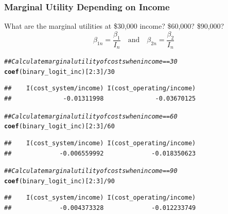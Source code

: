 \documentclass{beamer}\usepackage[]{graphicx}\usepackage[]{xcolor}
\makeatletter
\newcommand{\hlnum}[1]{\textcolor[rgb]{0.686,0.059,0.569}{#1}}%
\newcommand{\hlcom}[1]{\textcolor[rgb]{0.678,0.584,0.686}{\textit{#1}}}%
\newcommand{\hlopt}[1]{\textcolor[rgb]{0,0,0}{#1}}%
\newcommand{\hlstd}[1]{\textcolor[rgb]{0.345,0.345,0.345}{#1}}%
\newcommand{\hlkwd}[1]{\textcolor[rgb]{0.737,0.353,0.396}{\textbf{#1}}}%
\newenvironment{kframe}{%
 \def\at@end@of@kframe{}%
 \ifinner\ifhmode%
  \def\at@end@of@kframe{\end{minipage}}%
  \begin{minipage}{\columnwidth}%
 \fi\fi%
 \def\FrameCommand##1{\hskip\@totalleftmargin \hskip-\fboxsep
 \colorbox{shadecolor}{##1}\hskip-\fboxsep
     \hskip-\linewidth \hskip-\@totalleftmargin \hskip\columnwidth}%
 \MakeFramed {\advance\hsize-\width
   \@totalleftmargin\z@ \linewidth\hsize
   \@setminipage}}%
 {\par\unskip\endMakeFramed%
 \at@end@of@kframe}
\newenvironment{knitrout}{}{} %
\makeatother
\begin{document}
\begin{frame}[fragile]\frametitle{Marginal Utility Depending on Income}
    What are the marginal utilities at \$30,000 income? \$60,000? \$90,000?
    $$\beta_{1n} = \frac{\beta_1}{I_n} \quad \text{and} \quad \beta_{2n} = \frac{\beta_2}{I_n}$$
\begin{knitrout}\footnotesize
{}\color{fgcolor}\begin{kframe}
\begin{alltt}
\hlcom{## Calculate marginal utility of costs when income == 30}
\hlkwd{coef}\hlstd{(binary_logit_inc)[}\hlnum{2}\hlopt{:}\hlnum{3}\hlstd{]} \hlopt{/} \hlnum{30}
\end{alltt}
\begin{verbatim}
##    I(cost_system/income) I(cost_operating/income) 
##              -0.01311998              -0.03670125
\end{verbatim}
\begin{alltt}
\hlcom{## Calculate marginal utility of costs when income == 60}
\hlkwd{coef}\hlstd{(binary_logit_inc)[}\hlnum{2}\hlopt{:}\hlnum{3}\hlstd{]} \hlopt{/} \hlnum{60}
\end{alltt}
\begin{verbatim}
##    I(cost_system/income) I(cost_operating/income) 
##             -0.006559992             -0.018350623
\end{verbatim}
\begin{alltt}
\hlcom{## Calculate marginal utility of costs when income == 90}
\hlkwd{coef}\hlstd{(binary_logit_inc)[}\hlnum{2}\hlopt{:}\hlnum{3}\hlstd{]} \hlopt{/} \hlnum{90}
\end{alltt}
\begin{verbatim}
##    I(cost_system/income) I(cost_operating/income) 
##             -0.004373328             -0.012233749
\end{verbatim}
\end{kframe}
\end{knitrout}
\end{frame}
\end{document}
